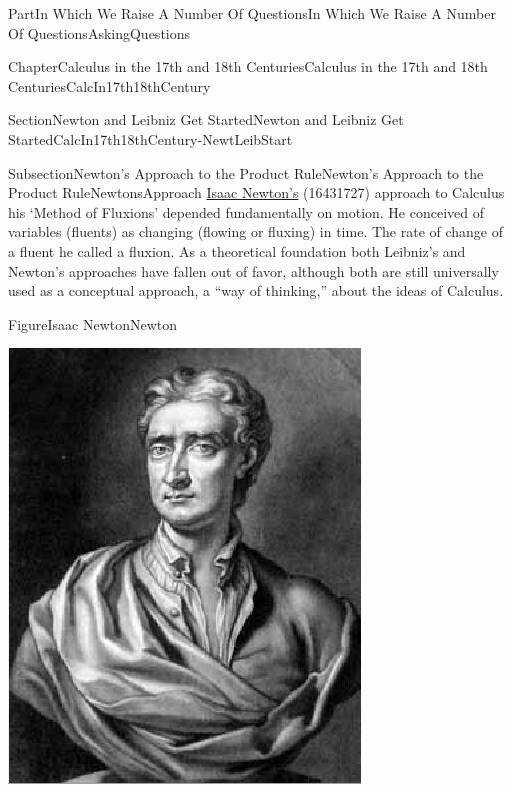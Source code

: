 \documentclass[oneside,10pt,]{book}
\numberwithin{equation}{part}
\begin{document}
\begin{partptx}{Part}{In Which We Raise A Number Of Questions}{}{In Which We Raise A Number Of Questions}{}{}{AskingQuestions}
\begin{chapterptx}{Chapter}{Calculus in the 17th and 18th Centuries}{}{Calculus in the 17th and 18th Centuries}{}{}{CalcIn17th18thCentury}
\begin{sectionptx}{Section}{Newton and Leibniz Get Started}{}{Newton and Leibniz Get Started}{}{}{CalcIn17th18thCentury-NewtLeibStart}
\typeout{************************************************}
%
\begin{subsectionptx}{Subsection}{Newton's Approach to the Product Rule}{}{Newton's Approach to the Product Rule}{}{}{NewtonsApproach}
\href{https://mathshistory.st-andrews.ac.uk/Biographies/Newton/}{Isaac Newton's} (1643\textendash{}1727) approach to Calculus \textemdash{} his `Method of Fluxions' \textemdash{} depended fundamentally on motion.  He conceived of variables (fluents) as changing (flowing or fluxing) in time.  The rate of change of a fluent he called a fluxion.  As a theoretical foundation both Leibniz's and Newton's approaches have fallen out of favor, although both are still universally used as a conceptual approach, a ``way of thinking,'' about the ideas of Calculus.%
\begin{figureptx}{Figure}{Isaac Newton}{Newton}{}%
%
%
\begin{image}{0.325}{0.35}{0.325}{}%
\includegraphics[width=\linewidth]{external/images/Newton.png}
\end{image}%

\end{figureptx}
\end{subsectionptx}
\end{sectionptx}
\end{chapterptx}
\end{partptx}
\end{document}
